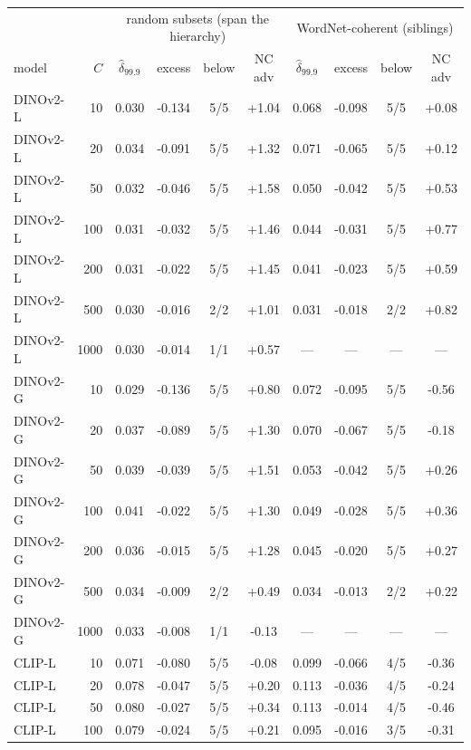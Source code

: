 \begin{table}[H]
\centering
\footnotesize
\setlength{\tabcolsep}{3.5pt}
\begin{tabular}{lr|cccc|cccc}
\toprule
 & & \multicolumn{4}{c|}{random subsets (span the hierarchy)} & \multicolumn{4}{c}{WordNet-coherent (siblings)} \\
model & $C$ & $\hat\delta_{99.9}$ & excess & below & NC adv & $\hat\delta_{99.9}$ & excess & below & NC adv \\
\midrule
DINOv2-L & 10 & 0.030 & -0.134 & 5/5 & +1.04 & 0.068 & -0.098 & 5/5 & +0.08 \\
DINOv2-L & 20 & 0.034 & -0.091 & 5/5 & +1.32 & 0.071 & -0.065 & 5/5 & +0.12 \\
DINOv2-L & 50 & 0.032 & -0.046 & 5/5 & +1.58 & 0.050 & -0.042 & 5/5 & +0.53 \\
DINOv2-L & 100 & 0.031 & -0.032 & 5/5 & +1.46 & 0.044 & -0.031 & 5/5 & +0.77 \\
DINOv2-L & 200 & 0.031 & -0.022 & 5/5 & +1.45 & 0.041 & -0.023 & 5/5 & +0.59 \\
DINOv2-L & 500 & 0.030 & -0.016 & 2/2 & +1.01 & 0.031 & -0.018 & 2/2 & +0.82 \\
DINOv2-L & 1000 & 0.030 & -0.014 & 1/1 & +0.57 & --- & --- & --- & --- \\
\midrule
DINOv2-G & 10 & 0.029 & -0.136 & 5/5 & +0.80 & 0.072 & -0.095 & 5/5 & -0.56 \\
DINOv2-G & 20 & 0.037 & -0.089 & 5/5 & +1.30 & 0.070 & -0.067 & 5/5 & -0.18 \\
DINOv2-G & 50 & 0.039 & -0.039 & 5/5 & +1.51 & 0.053 & -0.042 & 5/5 & +0.26 \\
DINOv2-G & 100 & 0.041 & -0.022 & 5/5 & +1.30 & 0.049 & -0.028 & 5/5 & +0.36 \\
DINOv2-G & 200 & 0.036 & -0.015 & 5/5 & +1.28 & 0.045 & -0.020 & 5/5 & +0.27 \\
DINOv2-G & 500 & 0.034 & -0.009 & 2/2 & +0.49 & 0.034 & -0.013 & 2/2 & +0.22 \\
DINOv2-G & 1000 & 0.033 & -0.008 & 1/1 & -0.13 & --- & --- & --- & --- \\
\midrule
CLIP-L & 10 & 0.071 & -0.080 & 5/5 & -0.08 & 0.099 & -0.066 & 4/5 & -0.36 \\
CLIP-L & 20 & 0.078 & -0.047 & 5/5 & +0.20 & 0.113 & -0.036 & 4/5 & -0.24 \\
CLIP-L & 50 & 0.080 & -0.027 & 5/5 & +0.34 & 0.113 & -0.014 & 4/5 & -0.46 \\
CLIP-L & 100 & 0.079 & -0.024 & 5/5 & +0.21 & 0.095 & -0.016 & 3/5 & -0.31 \\

\end{tabular}
\end{table}
